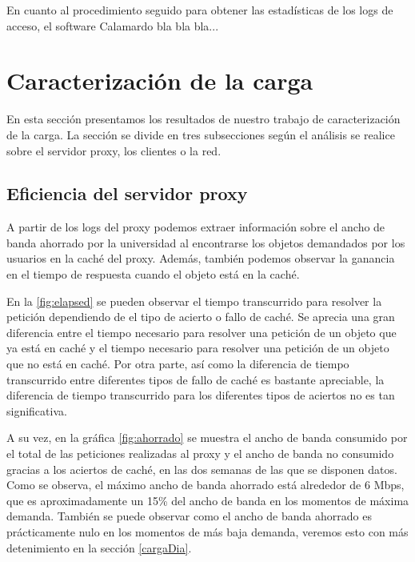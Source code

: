 \documentclass[twocolumn]{Jornadas}
\begin{document}
En cuanto al procedimiento seguido para obtener las estadísticas de los logs de acceso, el software Calamardo bla bla bla...


\section{Caracterización de la carga}
\label{resultados}

En esta sección presentamos los resultados de nuestro trabajo de caracterización de la carga. La sección se divide en tres subsecciones según el análisis se realice sobre el servidor proxy, los clientes o la red.

\subsection{Eficiencia del servidor proxy}
A partir de los logs del proxy podemos extraer información sobre el ancho de banda ahorrado por la universidad al encontrarse los objetos demandados por los usuarios en la caché del proxy. Además, también podemos observar la ganancia en el tiempo de respuesta cuando el objeto está en la caché.

En la \ref{fig:elapsed} se pueden observar el tiempo transcurrido para resolver la petición dependiendo de el tipo de acierto o fallo de caché. Se aprecia una gran diferencia entre el tiempo necesario para resolver una petición de un objeto que ya está en caché y el tiempo necesario para resolver una petición de un objeto que no está en caché. Por otra parte, así como la diferencia de tiempo transcurrido entre diferentes tipos de fallo de caché es bastante apreciable, la diferencia de tiempo transcurrido para los diferentes tipos de aciertos no es tan significativa.

A su vez, en la gráfica \ref{fig:ahorrado} se muestra el ancho de banda consumido por el total de las peticiones realizadas al proxy y el ancho de banda no consumido gracias a los aciertos de caché, en las dos semanas de las que se disponen datos. Como se observa, el máximo ancho de banda ahorrado está alrededor de 6 Mbps, que es aproximadamente un 15\% del ancho de banda en los momentos de máxima demanda. También se puede observar como el ancho de banda ahorrado es prácticamente nulo en los momentos de más baja demanda, veremos esto con más detenimiento en la sección \ref{cargaDia}.
\end{document}
